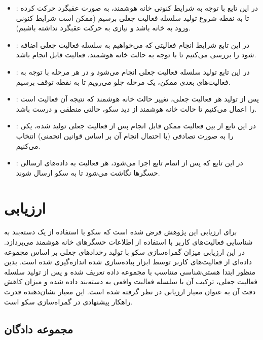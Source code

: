 \begin{itemize}
\item \textbf{}: در این تابع با توجه به شرایط کنونی خانه هوشمند، به صورت عقبگرد حرکت کرده تا به نقطه شروع تولید سلسله فعالیت جعلی برسیم (ممکن است شرایط کنونی ورود به خانه باشد و نیازی به حرکت عقبگرد نداشته باشیم).
\item \textbf{}: در این تابع شرایط انجام فعالیتی که می‌خواهیم به سلسله فعالیت جعلی اضافه شود را بررسی می‌کنیم تا با توجه به حالت خانه هوشمند، فعالیت قابل انجام باشد.
\item \textbf{}: در این تابع تولید سلسله فعالیت جعلی انجام می‌شود و در هر مرحله با توجه به فعالیت‌های بعدی ممکن، یک مرحله جلو می‌رویم تا به نقطه‌ توقف برسیم.
\item \textbf{}: پس از تولید هر فعالیت جعلی، تغییر حالت خانه هوشمند که نتیجه آن فعالیت است را اعمال می‌کنیم تا حالت خانه هوشمند از دید سکو، حالتی منطقی و درست باشد.
\item \textbf{}: در این تابع از بین فعالیت ممکن قابل انجام پس از فعالیت جعلی تولید شده، یکی را به صورت تصادفی (با احتمال انجام آن بر اساس قوانین انجمنی) انتخاب می‌کنیم.
\item \textbf{}: در این تابع که پس از اتمام تابع  اجرا می‌شود، هر فعالیت به داده‌های ارسالی حسگرها نگاشت می‌شود تا به سکو ارسال شوند.
\end{itemize}

\section{ارزیابی}

برای ارزیابی این پژوهش فرض شده است که سکو با استفاده از یک دسته‌بند به شناسایی فعالیت‌های کاربر با استفاده از اطلاعات حسگرهای خانه هوشمند می‌پردازد. در این ارزیابی میزان گمراه‌سازی سکو با تولید رخدادهای جعلی بر اساس مجموعه داده‌ای از فعالیت‌های کاربر توسط ابزار پیاده‌سازی شده اندازه‌گیری شده است. بدین منظور ابتدا هستی‌شناسی متناسب با مجموعه داده تعریف شده و پس از تولید سلسله فعالیت جعلی، ترکیب آن با سلسله فعالیت واقعی به دسته‌بند داده شده و میزان کاهش دقت آن به عنوان معیار ارزیابی در نظر گرفته شده است. این معیار نشان‌دهنده‌ قدرت راهکار پیشنهادی در گمراه‌سازی سکو است.

\subsection{مجموعه دادگان}

